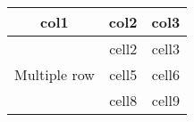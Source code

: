 \documentclass{article}
\begin{document}
\begin{tabular}{|c|c|c|}
\hline
col1 & col2 & col3 \\ \hline
\multirow{3}{1.5cm}{Multiple row} & cell2 & cell3 \\
&cell5 & cell6 \\
&cell8 & cell9 \\ 
\hline
\end{tabular} 
\end{document}
